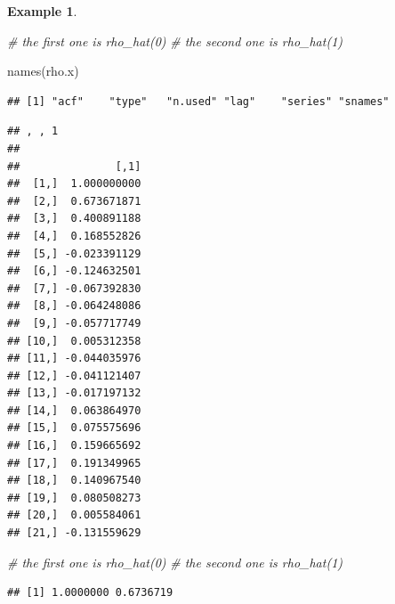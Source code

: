 \documentclass[
]{book}
\newenvironment{Shaded}{\begin{snugshade}}{\end{snugshade}}
\newcommand{\CommentTok}[1]{\textcolor[rgb]{0.56,0.35,0.01}{\textit{#1}}}
\newcommand{\DecValTok}[1]{\textcolor[rgb]{0.00,0.00,0.81}{#1}}
\newcommand{\FunctionTok}[1]{\textcolor[rgb]{0.00,0.00,0.00}{#1}}
\newcommand{\NormalTok}[1]{#1}
\newcommand{\SpecialCharTok}[1]{\textcolor[rgb]{0.00,0.00,0.00}{#1}}
\theoremstyle{definition}
\theoremstyle{definition}
\newtheorem{example}{Example}[chapter]
\theoremstyle{definition}
\theoremstyle{definition}
\theoremstyle{remark}
\begin{document}
\begin{example}
\begin{Shaded}
\begin{Highlighting}[]
\CommentTok{\# the first one is rho\_hat(0)}
\CommentTok{\# the second one is rho\_hat(1)}
\end{Highlighting}
\end{Shaded}

\begin{Shaded}
\begin{Highlighting}[]
\FunctionTok{names}\NormalTok{(rho.x)}
\end{Highlighting}
\end{Shaded}

\begin{verbatim}
## [1] "acf"    "type"   "n.used" "lag"    "series" "snames"
\end{verbatim}

\begin{Shaded}
\end{Shaded}

\begin{verbatim}
## , , 1
## 
##               [,1]
##  [1,]  1.000000000
##  [2,]  0.673671871
##  [3,]  0.400891188
##  [4,]  0.168552826
##  [5,] -0.023391129
##  [6,] -0.124632501
##  [7,] -0.067392830
##  [8,] -0.064248086
##  [9,] -0.057717749
## [10,]  0.005312358
## [11,] -0.044035976
## [12,] -0.041121407
## [13,] -0.017197132
## [14,]  0.063864970
## [15,]  0.075575696
## [16,]  0.159665692
## [17,]  0.191349965
## [18,]  0.140967540
## [19,]  0.080508273
## [20,]  0.005584061
## [21,] -0.131559629
\end{verbatim}

\begin{Shaded}
\begin{Highlighting}[]
\CommentTok{\# the first one is rho\_hat(0)}
\CommentTok{\# the second one is rho\_hat(1)}
\end{Highlighting}
\end{Shaded}

\begin{Shaded}
\end{Shaded}

\begin{verbatim}
## [1] 1.0000000 0.6736719
\end{verbatim}

\end{example}
\end{document}
